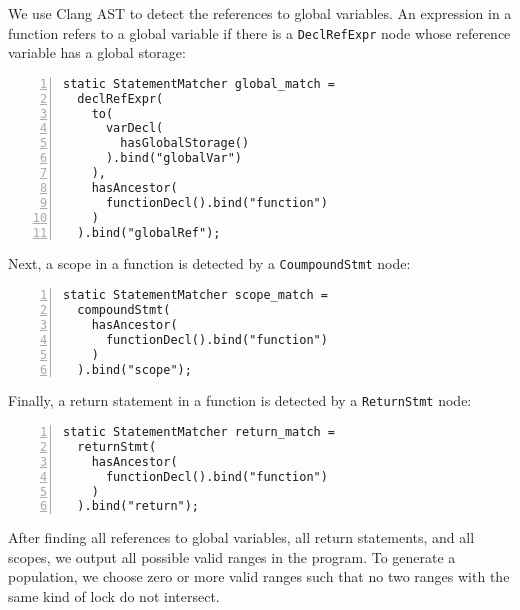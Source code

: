 We use Clang AST to detect the references to global variables. An expression in a function refers to a global variable if there is a \verb|DeclRefExpr| node whose reference variable has a global storage:

\begin{lstlisting}[frame=tb, xleftmargin=2em, framexleftmargin=1.5em, numbers=left]
static StatementMatcher global_match =
  declRefExpr(
    to(
      varDecl(
        hasGlobalStorage()
      ).bind("globalVar")
    ),
    hasAncestor(
      functionDecl().bind("function")
    )
  ).bind("globalRef");
  \end{lstlisting}

Next, a scope in a function is detected by a \verb|CoumpoundStmt| node:

\begin{lstlisting}[frame=tb, xleftmargin=2em, framexleftmargin=1.5em, numbers=left]
static StatementMatcher scope_match =
  compoundStmt(
    hasAncestor(
      functionDecl().bind("function")
    )
  ).bind("scope");
\end{lstlisting}

Finally, a return statement in a function is detected by a \verb|ReturnStmt| node:

\begin{lstlisting}[frame=tb, xleftmargin=2em, framexleftmargin=1.5em, numbers=left]
static StatementMatcher return_match =
  returnStmt(
    hasAncestor(
      functionDecl().bind("function")
    )
  ).bind("return");
\end{lstlisting}

After finding all references to global variables, all return statements, and all scopes, we output all possible valid ranges in the program. To generate a population, we choose zero or more valid ranges such that no two ranges with the same kind of lock do not intersect.

